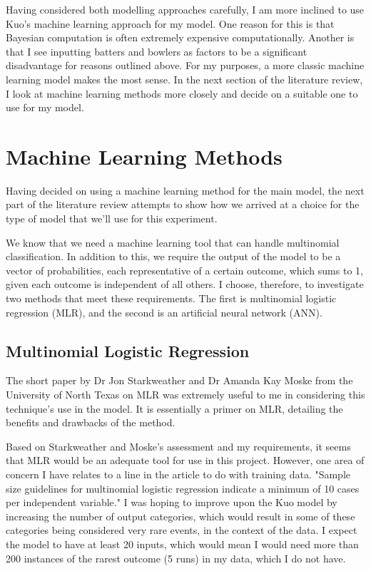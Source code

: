 
Having considered both modelling approaches carefully, I am more inclined to use Kuo’s machine learning approach for my model. One reason for this is that Bayesian computation is often extremely expensive computationally. Another is that I see inputting batters and bowlers as factors to be a significant disadvantage for reasons outlined above. For my purposes, a more classic machine learning model makes the most sense. In the next section of the literature review, I look at machine learning methods more closely and decide on a suitable one to use for my model.

\section{Machine Learning Methods}

Having decided on using a machine learning method for the main model, the next part of the literature review attempts to show how we arrived at a choice for the type of model that we'll use for this experiment.

We know that we need a machine learning tool that can handle multinomial classification. In addition to this, we require the output of the model to be a vector of probabilities, each representative of a certain outcome, which sums to 1, given each outcome is independent of all others. I choose, therefore, to investigate two methods that meet these requirements. The first is multinomial logistic regression (MLR), and the second is an artificial neural network (ANN).

\subsection{Multinomial Logistic Regression}

The short paper by Dr Jon Starkweather and Dr Amanda Kay Moske from the University of North Texas on MLR \cite{starkweather_multinomial_2011} was extremely useful to me in considering this technique's use in the model. It is essentially a primer on MLR, detailing the benefits and drawbacks of the method.

Based on Starkweather and Moske's assessment and my requirements, it seems that MLR would be an adequate tool for use in this project. However, one area of concern I have relates to a line in the article to do with training data. "Sample size guidelines for multinomial logistic regression indicate a minimum of 10 cases per independent variable." I was hoping to improve upon the Kuo model by increasing the number of output categories, which would result in some of these categories being considered very rare events, in the context of the data. I expect the model to have at least 20 inputs, which would mean I would need more than 200 instances of the rarest outcome (5 runs) in my data, which I do not have.


